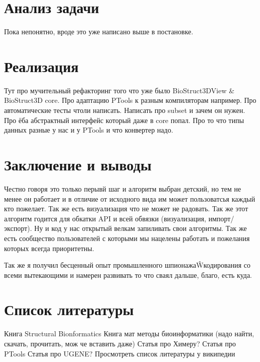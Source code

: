 \documentclass[a4paper, 14pt, titlepage, utf8]{extarticle}
\begin{document}
\section{Анализ задачи}

Пока непонятно, вроде это уже написано выше в постановке.

\section{Реализация}

Тут про мучительный рефакторинг того что уже было BioStruct3DView \& BioStruct3D core.
Про адаптацию PTools к разным компиляторам например.
Про автоматические тесты чтоли написать.
Написать про subset и зачем он нужен. 
Про ёба абстрактный интерфейс который даже в core попал.
Про то что типы данных разные у нас и у PTools и что конвертер надо.

\section{Заключение и выводы}

Честно говоря это только перывй шаг и алгоритм выбран детский, но тем не менее он работает и в отличие от исходного вида им может пользоватсья каждый кто пожелает. Так же есть визуализация что не может не радовать. Так же этот алгоритм годится для обкатки API и всей обвязки (визуализация, импорт/экспорт). Ну и код у нас открытый велкам запиливать свои алгоритмы. Так же есть сообщество пользователей с которыми мы нацелены работать и пожелания которых всегда приоритетны. 

Так же я получил бесценный опыт промышленного шпионажа\^Wкодирования со всеми вытекающими и намерен развивать то что сваял дальше, благо, есть куда.

\section{Список литературы}

Книга Structural Bionformatics
Книга мат методы биоинформатики (надо найти, скачать, прочитать, мож че вставить даже)
Статья про Химеру?
Статья про PTools
Статья про UGENE?
Просмотреть список литературы у википедии
\end{document}
